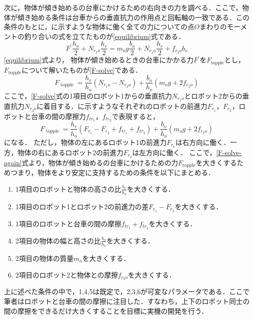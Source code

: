 次に，物体が傾き始めるの台車にかけるための右向きの力を調べる．ここで，物体が傾き始める条件は台車からの垂直抗力の作用点と回転軸の一致である．この条件のもとに，に示すような物体に働く全ての力についての点$O$まわりのモーメントの釣り合いの式を立てたものが\eqref{equilibrium}式である．
\begin{equation}
F^{\prime} \frac{h_{o}}{2}+N_{r_{2} o} \frac{h_{r}}{2}=m_{o} g \frac{b_{o}}{2}+N_{r_{1} o} \frac{h_{r}}{2}+f_{r_{2} o} b_{o}
\label{equilibrium}
\end{equation}
\eqref{equilibrium}式より，
物体が傾き始めるときの台車にかかる力$F^{\prime}$を$F_{\text{topple}}$とし，$F_{\text{topple}}$について解いたものが\eqref{F-solve}である．
\begin{equation}
    F_{\text { topple }}=\frac{h_{r}}{h_{o}}\left(N_{r_{1} o}-N_{r_{2} o}\right)+\frac{b_{o}}{h_{o}}\left(m_{o} g+2 f_{r_2 o}\right)
    \label{F-solve}
\end{equation}
ここで，\eqref{F-solve}式の1項目のロボット1からの垂直抗力$N_{r_1 o}$とロボット2からの垂直抗力$N_{r_2 o}$に着目する．に示すようなそれぞれのロボットの前進力$F_{r_1}$，$F_{r_2}$，ロボットと台車の間の摩擦力$f_{tr_1}$，$f_{tr_2}$で表現すると，
\begin{equation}
    F_{\text { topple }}=\frac{h_{r}}{h_{o}}\left(F_{r_{1}}-F_{r_{2}}+f_{t{r_1}}+f_{t{r_2}}\right)+\frac{b_{o}}{h_{o}}\left(m_{o} g+2 f_{r_2 o}\right)
    \label{F-solve-again}
\end{equation}
になる．
ただし，物体の左にあるロボット1の前進力$F_{r_{1}}$は右方向に働く．一方，物体の右にあるロボット2の前進力$F_{r_{2}}$は左方向に働く．
ここで，\eqref{F-solve-again}式より，物体が傾き始めるの台車にかけるための力$F_{\text{topple}}$を大きくするためつまり，物体をより安定に支持するための条件を以下にまとめる．
\begin{enumerate}
    \item 1項目のロボットと物体の高さの比$\frac{h_{r}}{h_{o}}$を大きくする．
    \item 1項目のロボット1とロボット2の前進力の差$F_{r_{1}}-F_{r_{2}}$を大きくする．
    \item 1項目のロボットと台車の間の摩擦$f_{t{r_1}}+f_{t{r_2}}$を大きくする．
    \item 2項目の物体の幅と高さの比$\frac{b_{o}}{h_{o}}$を大きくする．
    \item 2項目の物体の質量$m_{o}$を大きくする．
    \item 2項目のロボット2と物体との摩擦$f_{r_2 o}$を大きくする．  
\end{enumerate}
上に述べた条件の中で，1,4,5は既定で，2,3,6が可変なパラメータである．ここで筆者はロボットと台車の間の摩擦に注目した．すなわち，上下のロボット同士の間の摩擦をできるだけ大きくすることを目標に実機の開発を行う．


